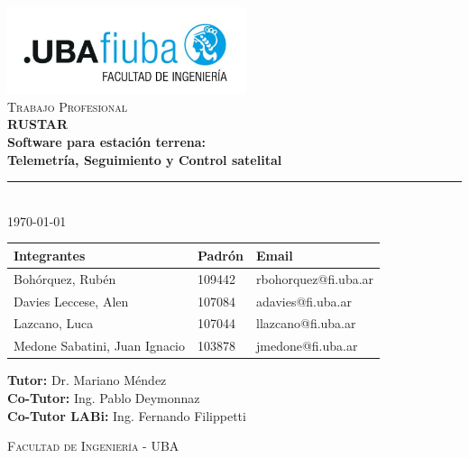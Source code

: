 \begin{titlepage}
\begin{center}

\includegraphics[width=7cm]{./images/fiuba_logo.jpg} \\[2cm]

\textsc{\Large Trabajo Profesional} \\[0.5cm]
{\huge \bfseries RUSTAR \\
Software para estación terrena: \\
Telemetría, Seguimiento  y Control satelital} \\[1cm]

\rule{\linewidth}{0.4pt} \\[1cm]

{\large \today} \\[2cm]

\hspace*{-1.5cm}
\begin{tabular}{ | l | l | l | }
    \hline
    \textbf{Integrantes} & \textbf{Padrón} & \textbf{Email} \\ \hline
    Bohórquez, Rubén & 109442 & rbohorquez@fi.uba.ar \\ \hline
    Davies Leccese, Alen & 107084 & adavies@fi.uba.ar \\ \hline
    Lazcano, Luca & 107044 & llazcano@fi.uba.ar \\ \hline
    Medone Sabatini, Juan Ignacio & 103878 & jmedone@fi.uba.ar \\ \hline
\end{tabular}

\vspace{1cm}

\textbf{Tutor:} Dr. Mariano Méndez\\[0.2cm]
\textbf{Co-Tutor:} Ing. Pablo Deymonnaz\\[0.2cm]
\textbf{Co-Tutor LABi:} Ing. Fernando Filippetti

\vfill

\textsc{Facultad de Ingeniería - UBA}

\end{center}
\end{titlepage}